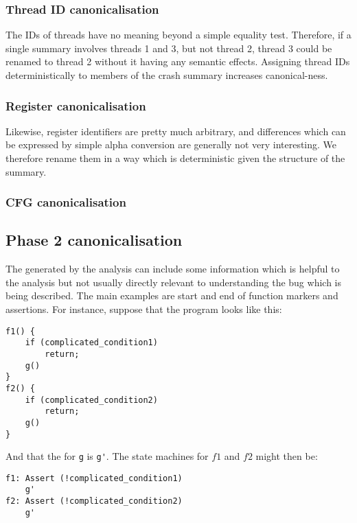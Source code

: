 \subsubsection{Thread ID canonicalisation}
The IDs of threads have no meaning beyond a simple equality test.
Therefore, if a single summary involves threads 1 and 3, but not thread 2, thread 3 could be renamed to thread 2 without it having any semantic effects.
Assigning thread IDs deterministically to members of the crash summary increases canonical-ness.

\subsubsection{Register canonicalisation}
Likewise, register identifiers are pretty much arbitrary, and differences which can be expressed by simple alpha conversion are generally not very interesting.
We therefore rename them in a way which is deterministic given the structure of the summary.

\subsubsection{CFG canonicalisation}

\subsection{Phase 2 canonicalisation}
The \StateMachines generated by the analysis can include some information which is helpful to the analysis but not usually directly relevant to understanding the bug which is being described.
The main examples are start and end of function markers and assertions.
For instance, suppose that the program looks like this:

\begin{verbatim}
f1() {
    if (complicated_condition1)
        return;
    g()
}
f2() {
    if (complicated_condition2)
        return;
    g()
}
\end{verbatim}

And that the \StateMachine for \verb|g| is \verb|g'|.
The state machines for $f1$ and $f2$ might then be:

\begin{verbatim}
f1: Assert (!complicated_condition1)
    g'
f2: Assert (!complicated_condition2)
    g'
\end{verbatim}

